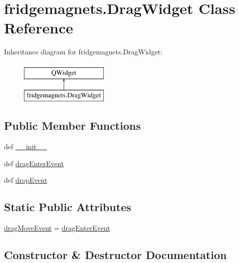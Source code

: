 \hypertarget{classfridgemagnets_1_1DragWidget}{}\section{fridgemagnets.\+Drag\+Widget Class Reference}
\label{classfridgemagnets_1_1DragWidget}
Inheritance diagram for fridgemagnets.\+Drag\+Widget\+:\begin{figure}[H]
\begin{center}
\leavevmode
\includegraphics[height=2.000000cm]{classfridgemagnets_1_1DragWidget}
\end{center}
\end{figure}
\subsection*{Public Member Functions}
\begin{DoxyCompactItemize}
\item 
def \hyperlink{classfridgemagnets_1_1DragWidget_a1bd9ab856020f72044062618b17e01ac}{\+\_\+\+\_\+init\+\_\+\+\_\+}
\item 
def \hyperlink{classfridgemagnets_1_1DragWidget_ab09337e2775e41e27d06c8a924defd67}{drag\+Enter\+Event}
\item 
def \hyperlink{classfridgemagnets_1_1DragWidget_a414b3841769784e04207b4591294b6ce}{drop\+Event}
\end{DoxyCompactItemize}
\subsection*{Static Public Attributes}
\begin{DoxyCompactItemize}
\item 
\hyperlink{classfridgemagnets_1_1DragWidget_aedafb022399e91d8a41f651fc973e153}{drag\+Move\+Event} = \hyperlink{classfridgemagnets_1_1DragWidget_ab09337e2775e41e27d06c8a924defd67}{drag\+Enter\+Event}
\end{DoxyCompactItemize}


\subsection{Constructor \& Destructor Documentation}
\hypertarget{classfridgemagnets_1_1DragWidget_a1bd9ab856020f72044062618b17e01ac}{}
